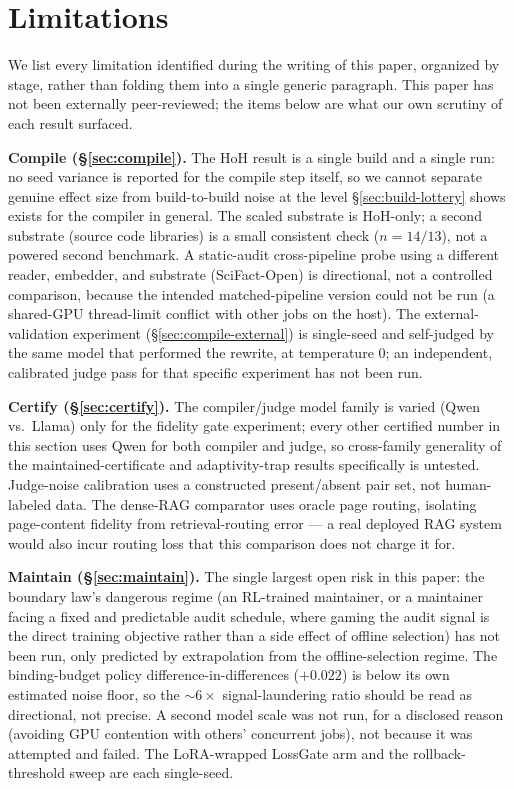 \section{Limitations}
\label{sec:limitations}

We list every limitation identified during the writing of this paper, organized by stage, rather than folding them into a single generic paragraph. This paper has not been externally peer-reviewed; the items below are what our own scrutiny of each result surfaced.

\textbf{Compile (\S\ref{sec:compile}).} The HoH result is a single build and a single run: no seed variance is reported for the compile step itself, so we cannot separate genuine effect size from build-to-build noise at the level \S\ref{sec:build-lottery} shows exists for the compiler in general. The scaled substrate is HoH-only; a second substrate (source code libraries) is a small consistent check ($n{=}14/13$), not a powered second benchmark. A static-audit cross-pipeline probe using a different reader, embedder, and substrate (SciFact-Open) is directional, not a controlled comparison, because the intended matched-pipeline version could not be run (a shared-GPU thread-limit conflict with other jobs on the host). The external-validation experiment (\S\ref{sec:compile-external}) is single-seed and self-judged by the same model that performed the rewrite, at temperature $0$; an independent, calibrated judge pass for that specific experiment has not been run.

\textbf{Certify (\S\ref{sec:certify}).} The compiler/judge model family is varied (Qwen vs.\ Llama) only for the fidelity gate experiment; every other certified number in this section uses Qwen for both compiler and judge, so cross-family generality of the maintained-certificate and adaptivity-trap results specifically is untested. Judge-noise calibration uses a constructed present/absent pair set, not human-labeled data. The dense-RAG comparator uses oracle page routing, isolating page-content fidelity from retrieval-routing error --- a real deployed RAG system would also incur routing loss that this comparison does not charge it for.

\textbf{Maintain (\S\ref{sec:maintain}).} The single largest open risk in this paper: the boundary law's dangerous regime (an RL-trained maintainer, or a maintainer facing a fixed and predictable audit schedule, where gaming the audit signal is the direct training objective rather than a side effect of offline selection) has not been run, only predicted by extrapolation from the offline-selection regime. The binding-budget policy difference-in-differences ($+0.022$) is below its own estimated noise floor, so the $\sim\!6\times$ signal-laundering ratio should be read as directional, not precise. A second model scale was not run, for a disclosed reason (avoiding GPU contention with others' concurrent jobs), not because it was attempted and failed. The LoRA-wrapped LossGate arm and the rollback-threshold sweep are each single-seed.

